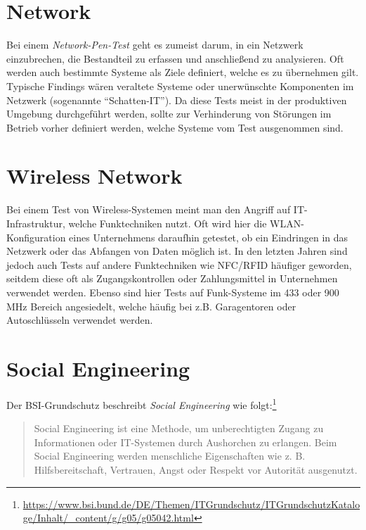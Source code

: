 	\section{Network}
	Bei einem \textit{Network-Pen-Test} geht es zumeist darum, in ein Netzwerk einzubrechen, die Bestandteil zu erfassen und anschließend zu analysieren. Oft werden auch bestimmte Systeme als Ziele definiert, welche es zu übernehmen gilt. Typische Findings wären veraltete Systeme oder unerwünschte Komponenten im Netzwerk (sogenannte "`Schatten-IT"'). Da diese Tests meist in der produktiven Umgebung durchgeführt werden, sollte zur Verhinderung von Störungen im Betrieb vorher definiert werden, welche Systeme vom Test ausgenommen sind.
	
	
	\section{Wireless Network}
	Bei einem Test von Wireless-Systemen meint man den Angriff auf IT-Infrastruktur, welche Funktechniken nutzt. Oft wird hier die  WLAN-Konfiguration eines Unternehmens daraufhin getestet, ob ein Eindringen in das Netzwerk oder das Abfangen von Daten möglich ist. In den letzten Jahren sind jedoch auch Tests auf andere Funktechniken wie NFC/RFID häufiger geworden, seitdem diese oft als Zugangskontrollen oder Zahlungsmittel in Unternehmen verwendet werden. Ebenso sind hier Tests auf Funk-Systeme im 433 oder 900 MHz Bereich angesiedelt, welche häufig bei z.B. Garagentoren oder Autoschlüsseln verwendet werden.
	
	\section{Social Engineering}
	Der BSI-Grundschutz beschreibt \textit{Social Engineering} wie folgt:\footnote{\url{https://www.bsi.bund.de/DE/Themen/ITGrundschutz/ITGrundschutzKataloge/Inhalt/_content/g/g05/g05042.html}}
	\begin{quote}
Social Engineering ist eine Methode, um unberechtigten Zugang zu Informationen oder IT-Systemen durch Aushorchen zu erlangen. Beim Social Engineering werden menschliche Eigenschaften wie z. B. Hilfsbereitschaft, Vertrauen, Angst oder Respekt vor Autorität ausgenutzt. 
	\end{quote}

